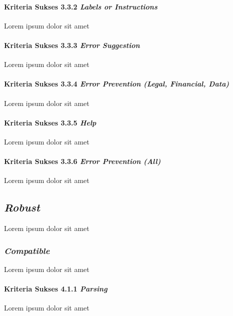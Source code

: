 \paragraph{Kriteria Sukses 3.3.2 \textit{Labels or Instructions}}
\label{sec:kriteria_sukses_3.3.2}
Lorem ipsum dolor sit amet

\paragraph{Kriteria Sukses 3.3.3 \textit{Error Suggestion}}
\label{sec:kriteria_sukses_3.3.3}
Lorem ipsum dolor sit amet

\paragraph{Kriteria Sukses 3.3.4 \textit{Error Prevention (Legal, Financial, Data)}}
\label{sec:kriteria_sukses_3.3.4}
Lorem ipsum dolor sit amet

\paragraph{Kriteria Sukses 3.3.5 \textit{Help}}
\label{sec:kriteria_sukses_3.3.5}
Lorem ipsum dolor sit amet

\paragraph{Kriteria Sukses 3.3.6 \textit{Error Prevention (All)}}
\label{sec:kriteria_sukses_3.3.6}
Lorem ipsum dolor sit amet


\subsection{\textit{Robust}}
\label{sec:robust}
Lorem ipsum dolor sit amet

\subsubsection{\textit{Compatible}}
\label{sec:compatible}
Lorem ipsum dolor sit amet

\paragraph{Kriteria Sukses 4.1.1 \textit{Parsing}}
\label{sec:kriteria_sukses_4.1.1}
Lorem ipsum dolor sit amet

